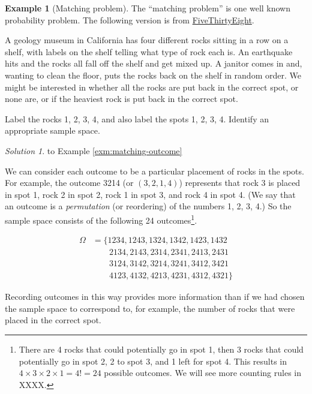 \documentclass[
]{book}
\theoremstyle{definition}
\theoremstyle{definition}
\newtheorem{example}{Example}[chapter]
\theoremstyle{definition}
\theoremstyle{remark}
\newtheorem*{solution}{Solution}
\begin{document}
\begin{example}[Matching problem]
\protect\hypertarget{exm:matching-outcome}{}{\label{exm:matching-outcome} {} }
The ``matching problem'' is one well known probability problem. The following version is from \href{https://fivethirtyeight.com/features/everythings-mixed-up-can-you-sort-it-all-out/}{FiveThirtyEight}.

A geology museum in California has four different rocks sitting in a row on a shelf, with labels on the shelf telling what type of rock each is. An earthquake hits and the rocks all fall off the shelf and get mixed up. A janitor comes in and, wanting to clean the floor, puts the rocks back on the shelf in random order. We might be interested in whether all the rocks are put back in the correct spot, or none are, or if the heaviest rock is put back in the correct spot.

Label the rocks 1, 2, 3, 4, and also label the spots 1, 2, 3, 4. Identify an appropriate sample space.
\end{example}

\begin{solution}
{}to Example \ref{exm:matching-outcome}
\end{solution}

We can consider each outcome to be a particular placement of rocks in the spots. For example, the outcome 3214 (or \((3, 2, 1, 4)\)) represents that rock 3 is placed in spot 1, rock 2 in spot 2, rock 1 in spot 3, and rock 4 in spot 4. (We say that an outcome is a \emph{permutation} (or reordering) of the numbers 1, 2, 3, 4.) So the sample space consists of the following 24 outcomes\footnote{There are 4 rocks that could potentially go in spot 1, then 3 rocks that could potentially go in spot 2, 2 to spot 3, and 1 left for spot 4. This results in \(4\times3\times2\times1=4! = 24\) possible outcomes. We will see more counting rules in XXXX.}.

\begin{align*}
\Omega & = \{1234, 1243, 1324, 1342, 1423, 1432 \\
  & \qquad 2134, 2143, 2314, 2341, 2413, 2431 \\
  & \qquad 3124, 3142, 3214, 3241, 3412, 3421 \\
  & \qquad 4123, 4132, 4213, 4231, 4312, 4321\}
\end{align*}

Recording outcomes in this way provides more information than if we had chosen the sample space to correspond to, for example, the number of rocks that were placed in the correct spot.
\end{document}
